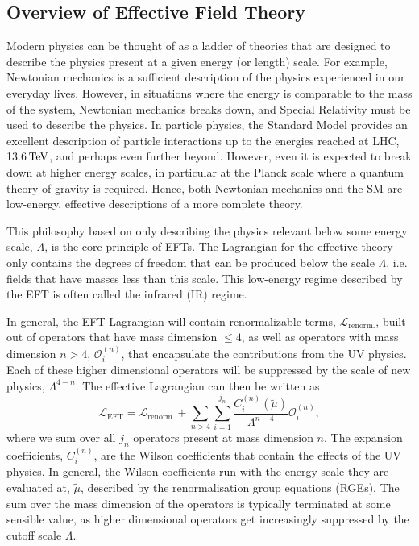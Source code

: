 \subsection{Overview of Effective Field Theory}

Modern physics can be thought of as a ladder of theories that are designed to describe the physics present at a given energy (or length) scale. For example, Newtonian mechanics is a sufficient description of the physics experienced in our everyday lives. However, in situations where the energy is comparable to the mass of the system, Newtonian mechanics breaks down, and Special Relativity must be used to describe the physics. In particle physics, the Standard Model provides an excellent description of particle interactions up to the energies reached at LHC, 13.6${\rm \,TeV}$, and perhaps even further beyond. However, even it is expected to break down at higher energy scales, in particular at the Planck scale where a quantum theory of gravity is required. Hence, both Newtonian mechanics and the SM are low-energy, effective descriptions of a more complete theory.

This philosophy based on only describing the physics relevant below some energy scale, $\Lambda$, is the core principle of EFTs. The Lagrangian for the effective theory only contains the degrees of freedom that can be produced below the scale $\Lambda$, i.e. fields that have masses less than this scale. This low-energy regime described by the EFT is often called the infrared (IR) regime. 

In general, the EFT Lagrangian will contain renormalizable terms, $\mathcal{L}_\mathrm{renorm.}$,  built out of operators that have mass dimension $\leq 4$, as well as operators with mass dimension $n> 4$, $\mathcal{O}_i^{(n)}$, that encapsulate the contributions from the UV physics. Each of these higher dimensional operators will be suppressed by the scale of new physics, $\Lambda^{4-n}$. 
The effective Lagrangian can then be written as
\begin{equation}
    \mathcal{L}_\mathrm{EFT} = \mathcal{L}_\mathrm{renorm.} +  \sum_{n>4}   \sum_{i = 1}^{j_n} \frac{C_i^{(n)} (\tilde{\mu})}{\Lambda^{n-4}}\mathcal{O}_i^{(n)},
    \label{eq:EFT_Lagrangian}
\end{equation}
where we sum over all $j_n$ operators present at mass dimension $n$. The expansion coefficients, $C_i^{(n)}$, are the Wilson coefficients that contain the effects of the UV physics. In general, the Wilson coefficients run with the energy scale they are evaluated at, $\tilde{\mu}$, described by the renormalisation group equations (RGEs).
The sum over the mass dimension of the operators is typically terminated at some sensible value, as higher dimensional operators get increasingly suppressed by the cutoff scale $\Lambda$.

